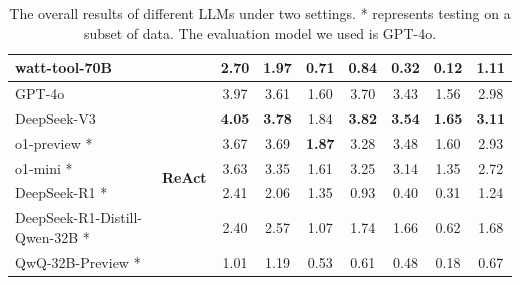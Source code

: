 \documentclass[11pt]{article}
\begin{document}
\begin{table}[t]
{{\begin{tabular}{l | c | c c c | c  c  c | c }
        \\
        
        
        watt-tool-70B
        &
		& 2.70 
		& 1.97 
        & 0.71
        & 0.84
        & 0.32
        & 0.12
        & 1.11
        
		\\
        \hline
        \hline

        GPT-4o
        & \multirow{7}{*}{\textbf{ReAct}}
		& 3.97 
		& 3.61 
        & 1.60
        & 3.70
        & 3.43
        & 1.56
        & 2.98
        
		\\
  
		DeepSeek-V3
        &
		& \textbf{4.05} 
        & \textbf{3.78}
        & 1.84
        & \textbf{3.82}
        & \textbf{3.54}
        & \textbf{1.65} 
        & \textbf{3.11}

        \\

        o1-preview *
        &
		& 3.67 
		& 3.69 
        & \textbf{1.87}
        & 3.28
        & 3.48
        & 1.60
        & 2.93
        
		\\
  
		o1-mini *
        &
		& 3.63 
        & 3.35 
        & 1.61
        & 3.25
        & 3.14
        & 1.35 
        & 2.72

        \\

        
        DeepSeek-R1 *
        &
		& 2.41 
        & 2.06 
        & 1.35
        & 0.93
        & 0.40
        & 0.31
        & 1.24

        \\


        DeepSeek-R1-Distill-Qwen-32B *
        &
		& 2.40 
		& 2.57 
        & 1.07 
        & 1.74 
        & 1.66 
        & 0.62
        & 1.68
        
        \\
        
        
        QwQ-32B-Preview *
        &
		& 1.01 
		& 1.19 
        & 0.53
        & 0.61
        & 0.48
        & 0.18
        & 0.67
        
		\\
        \hline



	\end{tabular}
}
}
	\caption{The overall results of different LLMs under two settings. * represents testing on a subset of data. The evaluation model we used is GPT-4o.
	}
	\label{table:overall_result}
\end{table}
\end{document}
